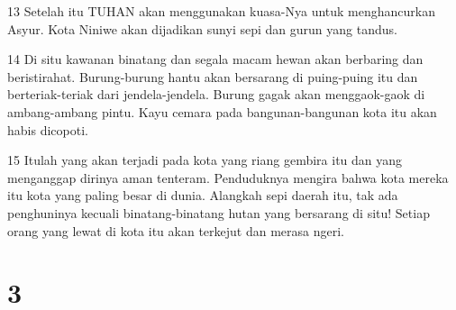 \par 13 Setelah itu TUHAN akan menggunakan kuasa-Nya untuk menghancurkan Asyur. Kota Niniwe akan dijadikan sunyi sepi dan gurun yang tandus.
\par 14 Di situ kawanan binatang dan segala macam hewan akan berbaring dan beristirahat. Burung-burung hantu akan bersarang di puing-puing itu dan berteriak-teriak dari jendela-jendela. Burung gagak akan menggaok-gaok di ambang-ambang pintu. Kayu cemara pada bangunan-bangunan kota itu akan habis dicopoti.
\par 15 Itulah yang akan terjadi pada kota yang riang gembira itu dan yang menganggap dirinya aman tenteram. Penduduknya mengira bahwa kota mereka itu kota yang paling besar di dunia. Alangkah sepi daerah itu, tak ada penghuninya kecuali binatang-binatang hutan yang bersarang di situ! Setiap orang yang lewat di kota itu akan terkejut dan merasa ngeri.

\chapter{3}

